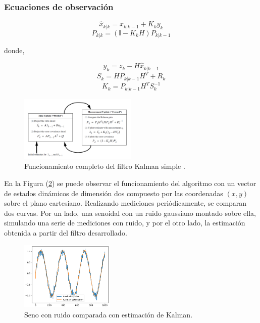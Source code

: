 \subsubsection{Ecuaciones de observación}

\begin{equation}
\hat{x}_{k|k} = \hat{x}_{k|k-1} + K_k y_k
\end{equation}
\begin{equation}
P_{k|k} = (\mathbb{I}-K_kH)P_{k|k-1}
\end{equation}

donde,

\begin{equation}
y_k = z_k - H\hat{x}_{k|k-1}
\end{equation}
\begin{equation}
S_k = HP_{k|k-1}H^T + R_k
\end{equation}
\begin{equation}
K_k = P_{k|k-1}H^TS_k^{-1}
\end{equation}

\begin{figure}[H]
		\centering
		\includegraphics[width=0.5\textwidth]{Imagenes/kalman1.png}
		\caption{Funcionamiento completo del filtro Kalman simple \cite{ref:kalman2}.}
		\label{fig:kalman1}
\end{figure}




 En la Figura (\ref{fig:kalman-comp}) se puede observar el funcionamiento del algoritmo con un vector de estados dinámicos de dimensión dos compuesto por las coordenadas $(x,y)$ sobre el plano cartesiano. Realizando mediciones periódicamente, se comparan dos curvas. Por un lado, una senoidal con un ruido gaussiano montado sobre ella, simulando una serie de mediciones con ruido, y por el otro lado, la estimación obtenida a partir del filtro desarrollado.

\begin{figure}[H]
\centering
	\includegraphics[width=0.4\textwidth]{Imagenes/Kalman_test_1.png}
	\caption{Seno con ruido comparada con estimación de Kalman.}
	\label{fig:kalman-comp}
\end{figure}

